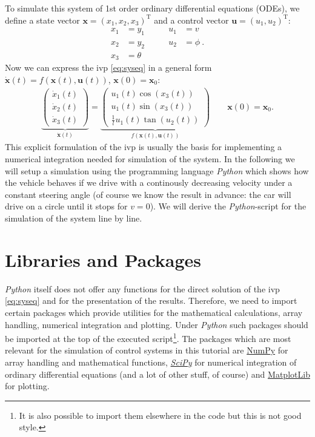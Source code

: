 \documentclass[a4paper,11pt,headings=standardclasses,parskip=half]{scrartcl}
\newcommand{\py}{\emph{Python}\xspace}
\newcommand{\scipy}{\emph{SciPy}\xspace}
\newcommand{\uu}{\mathbf{u}}
\newcommand{\x}{\mathbf{x}}
\newcommand{\xZero}{\mathbf{x}_0}
\begin{document}
To simulate this system of 1st order ordinary differential equations (ODEs), we define a state vector $\x=(x_1,x_2,x_3)^\mathrm{T}$ and a control vector $\uu=(u_1,u_2)^\mathrm{T}$:
\begin{subequations} \label{eq:odesys}
\begin{alignat}{2}
x_1 &= y_1 &\qquad u_1 &= v\\
x_2 &= y_2 &\qquad  u_2 &= \phi \:. \\
x_3 &= \theta
\end{alignat}
\end{subequations}
Now we can express the \gls{ivp} \eqref{eq:syseq} in a general form $\dot{\x}(t)=f(\x(t),\uu(t))$, $\x(0) = \xZero$:
\label{eq:ss_system}
\begin{align}
\underbrace{\begin{pmatrix} \dot{x}_1(t) \\ \dot{x}_2(t) \\ \dot{x}_3(t) \end{pmatrix}}_{\dot{\x}(t)} = \underbrace{\begin{pmatrix}  u_1(t) \cos(x_3(t)) \\ u_1(t) \sin(x_3(t)) \\ \frac{1}{l}u_1(t) \tan(u_2(t)) \end{pmatrix}}_{f(\x(t),\uu(t))} \qquad \x(0) = \xZero.
\end{align}
This explicit formulation of the \gls{ivp} is usually the basis for implementing a numerical integration needed for simulation of the system. In the following we will setup a simulation using the programming language \py which shows how the vehicle behaves if we drive with a continously decreasing velocity under a constant steering angle (of course we know the result in advance: the car will drive on a circle until it stops for $v = 0$). We will derive the \py-script for the simulation of the system line by line.


\section{Libraries and Packages}
\py itself does not offer any functions for the direct solution of the \gls{ivp} \eqref{eq:syseq} and for the presentation of the results. Therefore, we need to import certain packages which provide utilities for the mathematical calculations, array handling, numerical integration and plotting. Under \py such packages should be imported at the top of the executed script\footnote{It is also possible to import them elsewhere in the code but this is not good style.}. The packages which are most relevant for the simulation of control systems in this tutorial are \href{http://www.numpy.org/}{NumPy} for array handling and mathematical functions, \href{https://docs.scipy.org/doc/scipy/reference/}{\scipy} for numerical integration of ordinary differential equations (and a lot of other stuff, of course) and \href{https://matplotlib.org/}{MatplotLib} for plotting.
\end{document}
